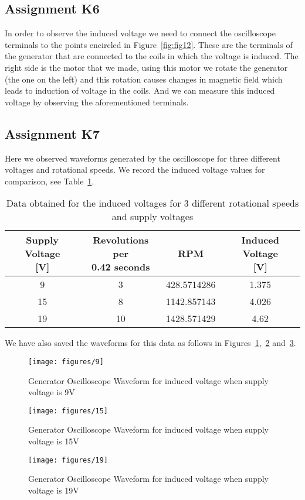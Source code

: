 \documentclass[12pt,a4paper]{report}
\begin{document}
\subsection{Assignment K6}%
In order to observe the induced voltage we need to connect the oscilloscope terminals to the points encircled in Figure~\ref{fig:fig12}. These are the terminals of the generator 
that are connected to the coils in which the voltage is induced. The right side is the motor that we made, using this motor we rotate the generator (the one on the left) and this 
rotation causes changes in magnetic field which leads to induction of voltage in the coils. And we can measure this induced voltage by observing the aforementioned terminals.\\
\subsection{Assignment K7}%
Here we observed waveforms generated by the oscilloscope for three different voltages and rotational speeds. We record the induced voltage values for comparison, see Table~\ref{tab:data}.
\begin{table}[htbp]
    \centering
    \caption{Data obtained for the induced voltages for 3 different rotational speeds and supply voltages}
    \label{tab:data}
    \begin{tabular}{cccc}
        \toprule
        \makecell[c]{\textbf{Supply Voltage} \\ \textbf{[V]}} & \makecell[c]{\textbf{Revolutions per} \\ \textbf{0.42 seconds}} & \textbf{RPM} & \makecell[c]{\textbf{Induced Voltage} \\ \textbf{[V]}} \\
        \midrule
        9   & 3  & 428.5714286 & 1.375 \\
        15  & 8 & 1142.857143 & 4.026 \\
        19  & 10  & 1428.571429 & 4.62 \\
        \bottomrule
    \end{tabular}
\end{table}
We have also saved the waveforms for this data as follows in Figures~\ref{fig:9},~\ref{fig:15} and~\ref{fig:19}.
\begin{figure}
	\texttt{[image: figures/9]}
	\caption{Generator Oscilloscope Waveform for induced voltage when supply voltage is 9V}\label{fig:9}
\end{figure}
\begin{figure}
	\texttt{[image: figures/15]}
	\caption{Generator Oscilloscope Waveform for induced voltage when supply voltage is 15V}\label{fig:15}
\end{figure}
\begin{figure}
         \texttt{[image: figures/19]}
         \caption{Generator Oscilloscope Waveform for induced voltage when supply voltage is 19V}\label{fig:19}
\end{figure}
\end{document}
